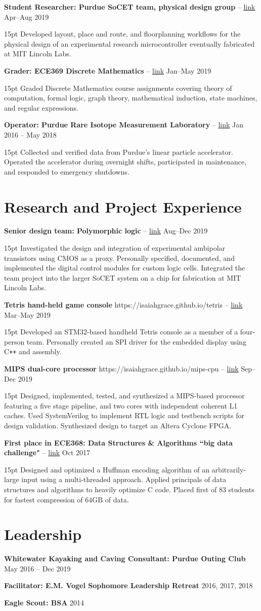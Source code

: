 \documentclass[10pt,letterpaper]{article}
\newcommand{\resumeItem}[4]{
	\begingroup
	\def\link{#2}
	\textbf{#1}
	\ifx\link\empty \else 
		-- \href{#2}{link}
	\fi
	\hfill #3\\
	\begin{adjustwidth}{15pt}{}
	#4
	\end{adjustwidth}
	\endgroup
}
\newcommand{\shortResumeItem}[2]{
	\begingroup
	\textbf{#1}
	\hfill #2\\
	\endgroup
}
\begin{document}
\resumeItem
{Student Researcher: Purdue SoCET team, physical design group}
{}
{Apr--Aug 2019}
{Developed layout, place and route, and floorplanning workflows for the physical design of an experimental research microcontroller eventually fabricated at MIT Lincoln Labs.}

\resumeItem
{Grader: ECE369 Discrete Mathematics}
{}
{Jan--May 2019}
{Graded Discrete Mathematics course assignments covering theory of computation, formal logic, graph theory, mathematical induction, state machines, and regular expressions.}

\resumeItem
{Operator: Purdue Rare Isotope Measurement Laboratory}
{}
{Jan 2016 -- May 2018}
{Collected and verified data from Purdue's linear particle accelerator. Operated the accelerator during overnight shifts, participated in maintenance, and responded to emergency shutdowns.}

\section*{Research and Project Experience}

\resumeItem
{Senior design team: Polymorphic logic}
{}
{Aug--Dec 2019}
{Investigated the design and integration of experimental ambipolar transistors using CMOS as a proxy. Personally specified, documented, and implemented the digital control modules for custom logic cells. Integrated the team project into the larger SoCET system on a chip for fabrication at MIT Lincoln Labs.}

\resumeItem
{Tetris hand-held game console}
{https://isaiahgrace.github.io/tetris}
{Mar--May 2019}
{Developed an STM32-based handheld Tetris console as a member of a four-person team. Personally created an SPI driver for the embedded display using C\texttt{++} and assembly.}

\resumeItem
{MIPS dual-core processor}
{https://isaiahgrace.github.io/mips-cpu}
{Sep--Dec 2019}
{Designed, implemented, tested, and synthesized a MIPS-based processor featuring a five stage pipeline, and two cores with independent coherent L1 caches. Used SystemVerilog to implement RTL logic and testbench scripts for design validation. Synthesized design to target an Altera Cyclone FPGA.}

\resumeItem
{First place in ECE368: Data Structures \& Algorithms ``big data challenge"}
{}
{Oct 2017}
{Designed and optimized a Huffman encoding algorithm of an arbitrarily-large input using a multi-threaded approach. Applied principals of data structures and algorithms to heavily optimize C code. Placed first of 83 students for fastest compression of 64GB of data.}

\section*{Leadership}
\shortResumeItem
{Whitewater Kayaking and Caving Consultant: Purdue Outing Club}
{May 2016 -- Dec 2019}

\shortResumeItem
{Facilitator: E.M. Vogel Sophomore Leadership Retreat}
{2016, 2017, 2018}

\shortResumeItem
{Eagle Scout: BSA}
{2014}
\end{document}

